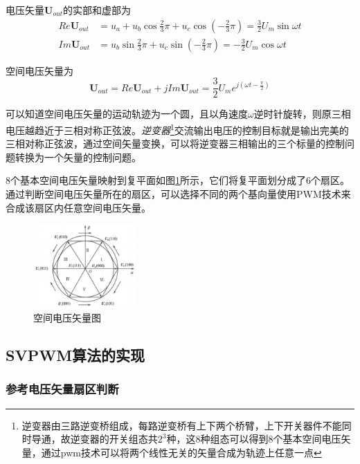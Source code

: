 \documentclass[main.tex]{subfiles}
\begin{document}
电压矢量$\textbf{U}_{out}$的实部和虚部为
\begin{equation}
\begin{aligned}
	Re\textbf{U}_{out} &=  u_a+u_b\cos\frac{2}{3}\pi+u_c\cos{(-\frac{2}{3}\pi)} = \frac{3}{2}U_m\sin\omega t	 \\
	Im\textbf{U}_{out} &= u_b\sin\frac{2}{3}\pi+u_c\sin(-\frac{2}{3}\pi) = -\frac{3}{2}U_m\cos\omega t
\end{aligned}
\end{equation}

空间电压矢量为
\begin{equation}
	\textbf{U}_{out} = Re\textbf{U}_{out} + jIm\textbf{U}_{out} = \frac{3}{2}U_me^{j(\omega t-\frac{\pi}{2})}
\end{equation}

可以知道空间电压矢量的运动轨迹为一个圆，且以角速度$\omega$逆时针旋转，则原三相电压越趋近于三相对称正弦波。\emph{逆变器}\footnote{逆变器由三路逆变桥组成，每路逆变桥有上下两个桥臂，上下开关器件不能同时导通，故逆变器的开关组态共$2^3$种，这8种组态可以得到8个基本空间电压矢量，通过pwm技术可以将两个线性无关的矢量合成为轨迹上任意一点}交流输出电压的控制目标就是输出完美的三相对称正弦波，通过空间矢量变换，可以将逆变器三相输出的三个标量的控制问题转换为一个矢量的控制问题。

8个基本空间电压矢量映射到复平面如图\ref{空间电压矢量图}所示，它们将复平面划分成了6个扇区。通过判断空间电压矢量所在的扇区，可以选择不同的两个基向量使用PWM技术来合成该扇区内任意空间电压矢量。

\begin{figure}[H]
	\centering
	\includegraphics[width=0.35\textwidth]{img/img_1.1.2.png}
	\caption{空间电压矢量图}
	\label{空间电压矢量图}
\end{figure}

\subsection{SVPWM算法的实现}

\subsubsection{参考电压矢量扇区判断}
\end{document}
